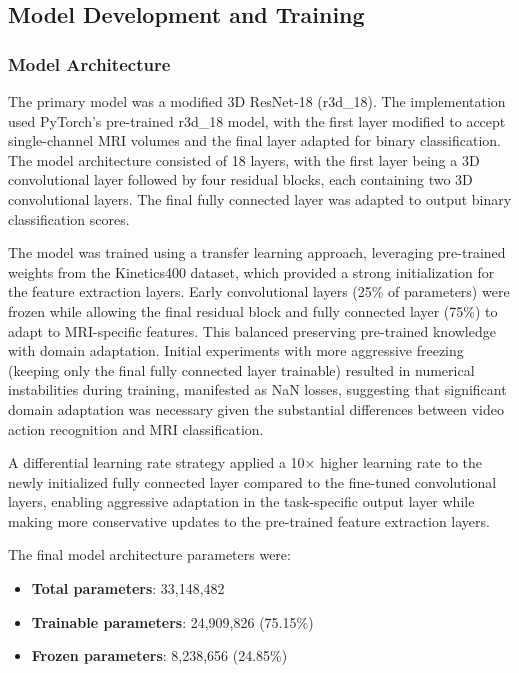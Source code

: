 \documentclass[11pt, a4paper]{article}
\begin{document}
\subsection{Model Development and Training}
\subsubsection{Model Architecture}

The primary model was a modified 3D ResNet-18 (r3d\_18). The implementation used PyTorch's pre-trained r3d\_18 model, with the first layer modified to accept single-channel MRI volumes and the final layer adapted for binary classification. The model architecture consisted of 18 layers, with the first layer being a 3D convolutional layer followed by four residual blocks, each containing two 3D convolutional layers. The final fully connected layer was adapted to output binary classification scores.

The model was trained using a transfer learning approach, leveraging pre-trained weights from the Kinetics400 dataset, which provided a strong initialization for the feature extraction layers. Early convolutional layers (25\% of parameters) were frozen while allowing the final residual block and fully connected layer (75\%) to adapt to MRI-specific features. This balanced preserving pre-trained knowledge with domain adaptation. Initial experiments with more aggressive freezing (keeping only the final fully connected layer trainable) resulted in numerical instabilities during training, manifested as NaN losses, suggesting that significant domain adaptation was necessary given the substantial differences between video action recognition and MRI classification.

A differential learning rate strategy applied a 10× higher learning rate to the newly initialized fully connected layer compared to the fine-tuned convolutional layers, enabling aggressive adaptation in the task-specific output layer while making more conservative updates to the pre-trained feature extraction layers.

The final model architecture parameters were:

\begin{itemize}
    \item \textbf{Total parameters}: 33,148,482
    \item \textbf{Trainable parameters}: 24,909,826 (75.15\%)
    \item \textbf{Frozen parameters}: 8,238,656 (24.85\%)
\end{itemize}
\end{document}
